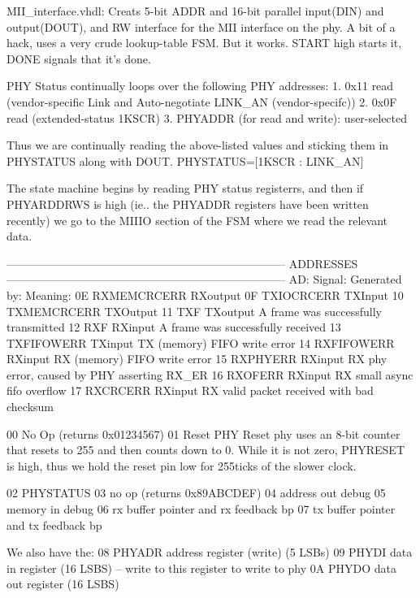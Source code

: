 MII_interface.vhdl:
Creats  5-bit ADDR and 16-bit parallel input(DIN) and output(DOUT), and RW  interface for the MII interface on the phy. A bit of a hack, uses a very crude lookup-table FSM. But it works. START high starts it, DONE signals that it's done. 

PHY Status continually loops over the following PHY addresses:
1. 0x11 read (vendor-specific Link and Auto-negotiate LINK_AN (vendor-specifc))
2. 0x0F read (extended-status 1KSCR)
3. PHYADDR (for read and write): user-selected

Thus we are continually reading the above-listed values and sticking them in PHYSTATUS along with DOUT. PHYSTATUS=[1KSCR : LINK_AN]


The state machine begins by reading PHY status registerrs, and then if PHYARDDRWS is high (ie.. the PHYADDR registers have been written recently) we go to the MIIIO section of the FSM where we read the relevant data.

--------------------------------------------------------------------------
ADDRESSES
--------------------------------------------------------------------------
AD: Signal:     Generated by:  Meaning:
0E  RXMEMCRCERR RXoutput       
0F  TXIOCRCERR  TXInput
10  TXMEMCRCERR TXOutput         
11  TXF         TXoutput        A frame was successfully transmitted 
12  RXF         RXinput         A frame was successfully received
13  TXFIFOWERR  TXinput         TX (memory) FIFO write error
14  RXFIFOWERR  RXinput         RX (memory) FIFO write error 
15  RXPHYERR    RXinput         RX phy error, caused by PHY asserting RX_ER
16  RXOFERR     RXinput         RX small async fifo overflow
17  RXCRCERR    RXinput         RX valid packet received with bad checksum


00  No Op (returns 0x01234567)
01  Reset PHY 
    Reset phy uses an 8-bit counter that resets to 255 and then counts down to 0. While it is not zero, PHYRESET is high, thus we hold the reset pin low for 255ticks of the slower clock. 

02 PHYSTATUS 
03 no op (returns 0x89ABCDEF)
04 address out debug
05 memory in debug
06 rx buffer pointer and rx feedback bp
07 tx buffer pointer and tx feedback bp

We also have the:
08 PHYADR address register (write) (5 LSBs)
09 PHYDI data in register (16 LSBS) -- write to this register to write to phy
0A PHYDO data out register (16 LSBS)


